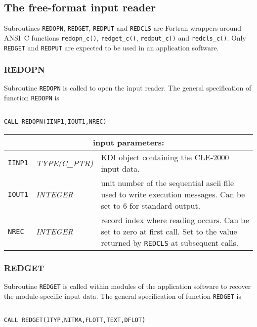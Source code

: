 \subsection {The free-format input reader}

Subroutines {\tt REDOPN}, {\tt REDGET}, {\tt REDPUT} and {\tt REDCLS} are Fortran wrappers around ANSI~C functions {\tt redopn\_c()}, {\tt redget\_c()}, {\tt redput\_c()} and {\tt redcls\_c()}.
Only {\tt REDGET} and {\tt REDPUT} are expected to be used in an application software.

\subsubsection{REDOPN}

Subroutine {\tt REDOPN} is called to open the input reader. The general specification of function {\tt REDOPN} is

\begin{verbatim}

CALL REDOPN(IINP1,IOUT1,NREC)
\end{verbatim}

\vskip 0.8cm

\noindent
\begin{tabular}{|p{1.5cm}|p{2.5cm}|p{10.5cm}|}
\hline
\multicolumn{3}{|c|}{\bf input parameters:} \\
\hline
{\tt IINP1} & {\it TYPE(C\_PTR)} & KDI object containing the CLE-2000 input data.\\
\hline
{\tt IOUT1} & {\it INTEGER} & unit number of the sequential {\sc ascii} file used to write execution messages. Can be set to 6 for standard output. \\
\hline
{\tt NREC} & {\it INTEGER} & record index where reading occurs. Can be set to zero at first call. Set to the value returned by {\tt REDCLS} at subsequent calls.\\
\hline
\end{tabular}

\subsubsection{REDGET}

Subroutine {\tt REDGET} is called within modules of the application software to recover the module-specific input data.
The general specification of function {\tt REDGET} is

\begin{verbatim}

CALL REDGET(ITYP,NITMA,FLOTT,TEXT,DFLOT)
\end{verbatim}

